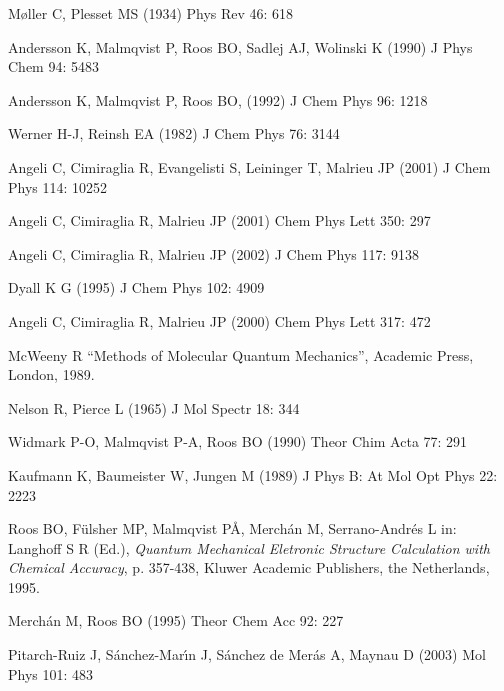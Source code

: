 \documentclass[global,referee]{svjour}
\begin{document}
\begin{thebibliography}{References}
%
%
\newcommand{\uau}[2]{#2 #1 }
\newcommand{\au}[2]{#2 #1, }
\newcommand{\lau}[2]{#2 #1 }
\newcommand{\jo}[4]{(#4) #1 #2: #3}
%

\au{C}{M\o ller}  \lau{MS}{Plesset}
\jo{Phys Rev}{46}{618}{1934}

\au{K}{Andersson} \au{P}{Malmqvist} \au{BO}{Roos} \au{AJ}{Sadlej} \lau{K}{Wolinski}
\jo{J Phys Chem}{94}{5483}{1990}

\au{K}{Andersson} \au{P}{Malmqvist} \au{BO}{Roos}
\jo{J Chem Phys}{96}{1218}{1992}

\au{H-J}{Werner} \lau{EA}{Reinsh}
\jo{J Chem Phys}{76}{3144}{1982}

\au{C}{Angeli} \au{R}{Cimiraglia} \au{S}{Evangelisti} \au{T}{Leininger} \lau{JP}{Malrieu}
\jo{J Chem Phys}{114}{10252}{2001}

\au{C}{Angeli} \au{R}{Cimiraglia} \lau{JP}{Malrieu}
\jo{Chem Phys Lett}{350}{297}{2001}

\au{C}{Angeli} \au{R}{Cimiraglia} \lau{JP}{Malrieu}
\jo{J Chem Phys}{117}{9138}{2002}

\uau{K G}{Dyall}
\jo{J Chem Phys}{102}{4909}{1995}

\au{C}{Angeli} \au{R}{Cimiraglia} \lau{JP}{Malrieu}
\jo{Chem Phys Lett}{317}{472}{2000}

\uau{R}{McWeeny} ``Methods of Molecular Quantum Mechanics'', Academic
Press, London, 1989.

\au{R}{Nelson} \lau{L}{Pierce}
\jo{J Mol Spectr}{18}{344}{1965}

\au{P-O}{Widmark} \au{P-A}{Malmqvist} \lau{BO}{Roos}
\jo{Theor Chim Acta}{77}{291}{1990}

\au{K}{Kaufmann} \au{W}{Baumeister} \lau{M}{Jungen}
\jo{J Phys B: At Mol Opt Phys}{22}{2223}{1989}

\au{BO}{Roos} \au{MP}{F\"ulsher} \au{P\AA}{Malmqvist}
\au{M}{Merch\'an} \lau{L}{Serrano-Andr\'es}
in: Langhoff S R (Ed.), {\it Quantum Mechanical Eletronic Structure
Calculation with Chemical Accuracy}, p. 357-438, Kluwer Academic Publishers, the Netherlands,
1995.

\au{M}{Merch\'an} \lau{BO}{Roos}
\jo{Theor Chem Acc}{92}{227}{1995}

\au{J}{Pitarch-Ruiz} \au{J}{S\'anchez-Mar\'\i n} \au{A}{S\'anchez de Mer\'as} \lau{D}{Maynau}
\jo{Mol Phys}{101}{483}{2003}


\end{thebibliography}
\end{document}
